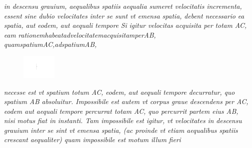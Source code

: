 \textit{in descensu\protect{} grauium\protect{},
aequalibus spatiis aequalia sumeret velocitatis incrementa, essent sine dubio velocitates %
inter se sunt vt emensa spatia, debent necessario ea spatia, aut eodem, aut aequali tempore
Si igitur velocitas acquisita per totam AC, eam rationem\hfill habeat\hfill ad\hfill velocitatem\hfill acquisitam\hfill per\hfill AB,\hfill
quam\hfill spatium\hfill AC,\hfill ad\hfill spatium\hfill AB,}
\pend
\newpage
\pstart
\noindent
\begin{figure}%
\vspace{-4mm}\centering%
\hspace*{7mm}\includegraphics[trim = 1mm 1mm -13mm 2mm, clip, width=0.15\textwidth]{images/cazreus1645-d1.pdf}%
\newline
\noindent{}%
\end{figure}
\noindent%
\textit{necesse est vt spatium totum AC, eodem, aut aequali tempore decurratur,
quo spatium AB absoluitur. Impossibile est autem vt corpus graue descendens per AC, eodem aut aequali tempore percurrat totam AC,
quo percurrit partem eius AB, nisi motus fiat in instanti.
Tam impossibile est igitur, vt velocitates in descensu\protect{}
grauium\protect{} inter se sint vt emensa spatia,
(ac proinde vt etiam aequalibus spatiis crescant aequaliter) quam impossibile est motum illum fieri }
